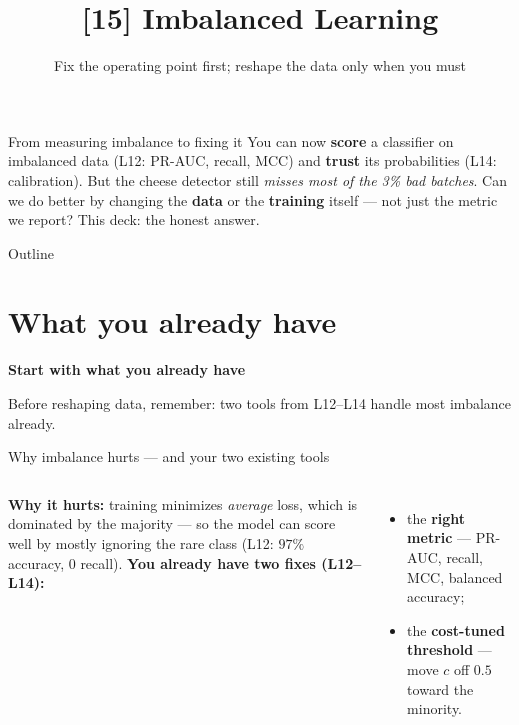 \documentclass[aspectratio=169]{beamer}
\title{[15] Imbalanced Learning}
\subtitle{Fix the operating point first; reshape the data only when you must}
\date{}
\begin{document}
\begin{frame}{From measuring imbalance to fixing it}
  You can now \textbf{score} a classifier on imbalanced data (L12: PR-AUC, recall, MCC) and
  \textbf{trust} its probabilities (L14: calibration). But the cheese detector still \emph{misses
  most of the 3\% bad batches}.
  \vfill
  Can we do better by changing the \textbf{data} or the \textbf{training} itself --- not just the
  metric we report? This deck: the honest answer.
  \vfill
\end{frame}

\begin{frame}{Outline}
  \tableofcontents
\end{frame}

\section{What you already have}

\begin{frame}[plain]
  \vfill
  \begin{center}
    {\Large\color{popblue}\textbf{Start with what you already have}}\\[0.9em]
    \begin{minipage}{0.82\textwidth}\centering\small
      Before reshaping data, remember: two tools from L12--L14 handle most imbalance already.
    \end{minipage}
  \end{center}
  \vfill
\end{frame}

\begin{frame}{Why imbalance hurts --- and your two existing tools}
  \begin{columns}[T]
    \textbf{Why it hurts:} training minimizes \emph{average} loss, which is dominated by the
    majority --- so the model can score well by mostly ignoring the rare class (L12: $97\%$
    accuracy, $0$ recall).
    \textbf{You already have two fixes (L12--L14):}
    \begin{itemize}\small
      \item the \textbf{right metric} --- PR-AUC, recall, MCC, balanced accuracy;
      \item the \textbf{cost-tuned threshold} --- move $c$ off $0.5$ toward the minority.
    \end{itemize}
  \end{columns}
  \vfill
\end{frame}
\end{document}
